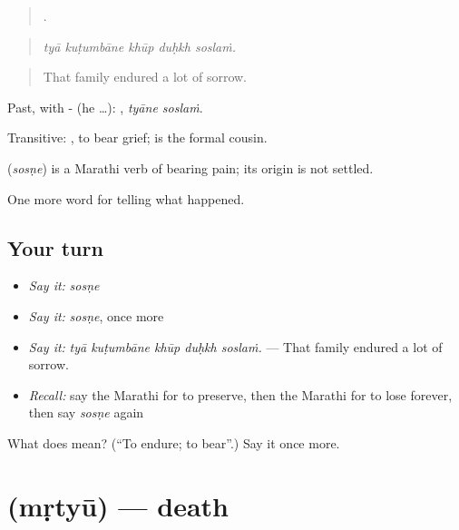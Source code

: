 \begin{quote}
    .
\end{quote}

\begin{quote}
\emph{tyā kuṭumbāne khūp duḥkh soslaṁ.}
\end{quote}

\begin{quote}
That family endured a lot of sorrow.
\end{quote}

Past, with - (he …):  , \emph{tyāne soslaṁ}.

Transitive:  , to bear grief;   is the formal cousin.

\begin{cousinweb}
\textbf{} (\emph{sosṇe}) is a Marathi verb of bearing pain; its origin is not settled.
\end{cousinweb}

\begin{grammarlens}[title={What you've built}]
One more word for telling what happened.
\end{grammarlens}

\subsection*{Your turn}
\begin{itemize}
\raggedright
  \item \emph{Say it:} \emph{sosṇe}
  \item \emph{Say it:} \emph{sosṇe}, once more
  \item \emph{Say it:} \emph{tyā kuṭumbāne khūp duḥkh soslaṁ.} — That family endured a lot of sorrow.
  \item \emph{Recall:} say the Marathi for to preserve, then the Marathi for to lose forever, then say \emph{sosṇe} again
\end{itemize}

\begin{tcolorbox}[breakable,colback=teal!4,colframe=teal!35!black,title={Before you move on}]
What does  mean? (\textquotedblleft{}To endure; to bear\textquotedblright{}.) Say it once more.
\end{tcolorbox}
\section[\texorpdfstring{\mr{मृत्यू} (mṛtyū)}{मृत्यू (mṛtyū)}]{ (mṛtyū) — death}

